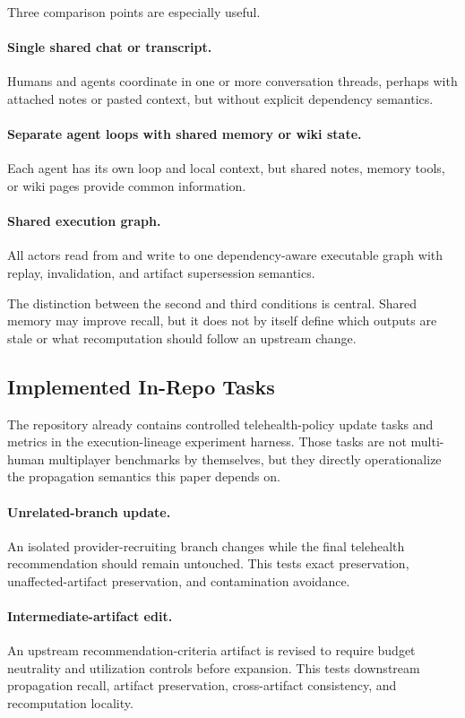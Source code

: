 \documentclass{article}
\begin{document}
Three comparison points are especially useful.

\paragraph{Single shared chat or transcript.}
Humans and agents coordinate in one or more conversation threads, perhaps with attached notes or pasted context, but without explicit dependency semantics.

\paragraph{Separate agent loops with shared memory or wiki state.}
Each agent has its own loop and local context, but shared notes, memory tools, or wiki pages provide common information.

\paragraph{Shared execution graph.}
All actors read from and write to one dependency-aware executable graph with replay, invalidation, and artifact supersession semantics.

The distinction between the second and third conditions is central. Shared memory may improve recall, but it does not by itself define which outputs are stale or what recomputation should follow an upstream change.

\subsection{Implemented In-Repo Tasks}

The repository already contains controlled telehealth-policy update tasks and metrics in the execution-lineage experiment harness. Those tasks are not multi-human multiplayer benchmarks by themselves, but they directly operationalize the propagation semantics this paper depends on.

\paragraph{Unrelated-branch update.}
An isolated provider-recruiting branch changes while the final telehealth recommendation should remain untouched. This tests exact preservation, unaffected-artifact preservation, and contamination avoidance.

\paragraph{Intermediate-artifact edit.}
An upstream recommendation-criteria artifact is revised to require budget neutrality and utilization controls before expansion. This tests downstream propagation recall, artifact preservation, cross-artifact consistency, and recomputation locality.
\end{document}
